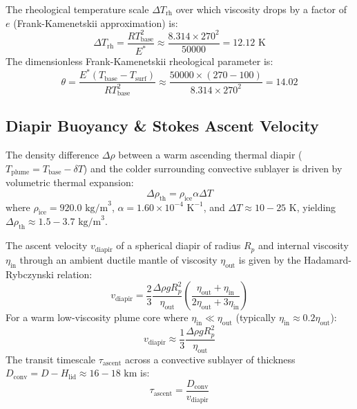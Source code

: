 \documentclass[11pt,a4paper]{article}
\begin{document}
The rheological temperature scale $\Delta T_{\text{rh}}$ over which viscosity drops by a factor of $e$ (Frank-Kamenetskii approximation) is:
\begin{equation}
\Delta T_{\text{rh}} = \frac{R T_{\text{base}}^2}{E^*} \approx \frac{8.314 \times 270^2}{50000} = 12.12\text{ K}
\end{equation}
The dimensionless Frank-Kamenetskii rheological parameter is:
\begin{equation}
\theta = \frac{E^*(T_{\text{base}} - T_{\text{surf}})}{R T_{\text{base}}^2} \approx \frac{50000 \times (270 - 100)}{8.314 \times 270^2} = 14.02
\end{equation}

\subsection{Diapir Buoyancy \& Stokes Ascent Velocity}
The density difference $\Delta \rho$ between a warm ascending thermal diapir ($T_{\text{plume}} = T_{\text{base}} - \delta T$) and the colder surrounding convective sublayer is driven by volumetric thermal expansion:
\begin{equation}
\Delta \rho_{\text{th}} = \rho_{\text{ice}} \alpha \Delta T
\end{equation}
where $\rho_{\text{ice}} = 920.0\text{ kg/m}^3$, $\alpha = 1.60 \times 10^{-4}\text{ K}^{-1}$, and $\Delta T \approx 10 - 25\text{ K}$, yielding $\Delta \rho_{\text{th}} \approx 1.5 - 3.7\text{ kg/m}^3$.

The ascent velocity $v_{\text{diapir}}$ of a spherical diapir of radius $R_p$ and internal viscosity $\eta_{\text{in}}$ through an ambient ductile mantle of viscosity $\eta_{\text{out}}$ is given by the Hadamard-Rybczynski relation:
\begin{equation}
v_{\text{diapir}} = \frac{2}{3} \frac{\Delta \rho g R_p^2}{\eta_{\text{out}}} \left( \frac{\eta_{\text{out}} + \eta_{\text{in}}}{2\eta_{\text{out}} + 3\eta_{\text{in}}} \right)
\end{equation}
For a warm low-viscosity plume core where $\eta_{\text{in}} \ll \eta_{\text{out}}$ (typically $\eta_{\text{in}} \approx 0.2 \eta_{\text{out}}$):
\begin{equation}
v_{\text{diapir}} \approx \frac{1}{3} \frac{\Delta \rho g R_p^2}{\eta_{\text{out}}}
\end{equation}
The transit timescale $\tau_{\text{ascent}}$ across a convective sublayer of thickness $D_{\text{conv}} = D - H_{\text{lid}} \approx 16 - 18\text{ km}$ is:
\begin{equation}
\tau_{\text{ascent}} = \frac{D_{\text{conv}}}{v_{\text{diapir}}}
\end{equation}
\end{document}
